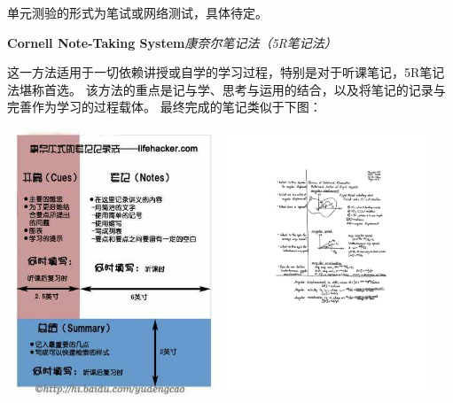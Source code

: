 单元测验的形式为笔试或网络测试，具体待定。

\newpage

\begin{shaded}
	{\bf\Large Cornell Note-Taking System}\hfill{\it 康奈尔笔记法（5R笔记法）}
	
	\bigskip
	
	这一方法适用于一切依赖讲授或自学的学习过程，特别是对于听课笔记，5R笔记法堪称首选。
	该方法的重点是记与学、思考与运用的结合，以及将笔记的记录与完善作为学习的过程载体。
	最终完成的笔记类似于下图：
	
	
	\begin{center}
		\includegraphics[height=8cm]{./images/00/Cornell-NTS/NTS-CH.jpg}\quad
		\includegraphics[height=8cm]{./images/00/Cornell-NTS/exCNTS.pdf}
	\end{center}
	

\end{shaded}
